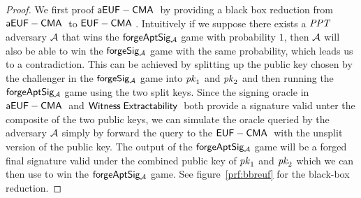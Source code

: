 \begin{proof}
    We first proof $\mathsf{aEUF-CMA\;}$ by providing a black box reduction from $\mathsf{aEUF-CMA\;}$ to $\mathsf{EUF-CMA\;}$.
    Intuitively if we suppose there exists a $\mathit{PPT}$ adversary $\mathcal{A}$ that wins the $\mathsf{forgeAptSig_{\mathcal{A}}}$ game with probability $1$,
    then $\mathcal{A}$ will also be able to win the $\mathsf{forgeSig_{\mathcal{A}}}$ game with the same probability, which leads us to a contradiction.
    This can be achieved by splitting up the public key chosen by the challenger in the $\mathsf{forgeSig_{\mathcal{A}}}$ game into $\mathit{pk}_1$ and $\mathit{pk}_2$ and then running the
    $\mathsf{forgeAptSig_{\mathcal{A}}}$ game using the two split keys.
    Since the signing oracle in $\mathsf{aEUF-CMA\;}$ and $\mathsf{Witness\;Extractability\;}$ both provide a signature valid unter the composite of the two public keys, we can simulate the oracle
    queried by the adversary $\mathcal{A}$ simply by forward the query to the $\mathsf{EUF-CMA\;}$ with the unsplit version of the public key.
    The output of the $\mathsf{forgeAptSig_{\mathcal{A}}}$ game will be a forged final signature valid under the combined public key of $\mathit{pk}_1$ and $\mathit{pk}_2$
    which we can then use to win the $\mathsf{forgeAptSig_{\mathcal{A}}}$ game. See figure~\ref{prf:bbreuf} for the black-box reduction.


\end{proof}
